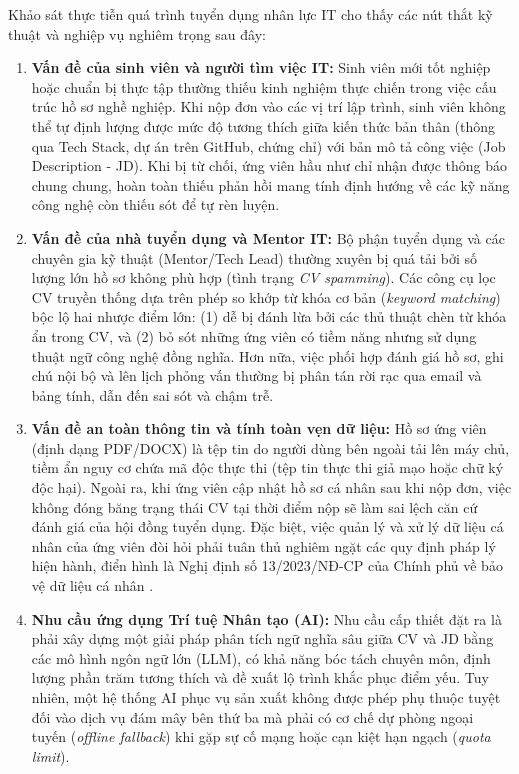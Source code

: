 Khảo sát thực tiễn quá trình tuyển dụng nhân lực IT cho thấy các nút thắt kỹ thuật và nghiệp vụ nghiêm trọng sau đây:
\begin{enumerate}
    \item \textbf{Vấn đề của sinh viên và người tìm việc IT:} Sinh viên mới tốt nghiệp hoặc chuẩn bị thực tập thường thiếu kinh nghiệm thực chiến trong việc cấu trúc hồ sơ nghề nghiệp. Khi nộp đơn vào các vị trí lập trình, sinh viên không thể tự định lượng được mức độ tương thích giữa kiến thức bản thân (thông qua Tech Stack, dự án trên GitHub, chứng chỉ) với bản mô tả công việc (Job Description - JD). Khi bị từ chối, ứng viên hầu như chỉ nhận được thông báo chung chung, hoàn toàn thiếu phản hồi mang tính định hướng về các kỹ năng công nghệ còn thiếu sót để tự rèn luyện.
    \item \textbf{Vấn đề của nhà tuyển dụng và Mentor IT:} Bộ phận tuyển dụng và các chuyên gia kỹ thuật (Mentor/Tech Lead) thường xuyên bị quá tải bởi số lượng lớn hồ sơ không phù hợp (tình trạng \textit{CV spamming}). Các công cụ lọc CV truyền thống dựa trên phép so khớp từ khóa cơ bản (\textit{keyword matching}) bộc lộ hai nhược điểm lớn: (1) dễ bị đánh lừa bởi các thủ thuật chèn từ khóa ẩn trong CV, và (2) bỏ sót những ứng viên có tiềm năng nhưng sử dụng thuật ngữ công nghệ đồng nghĩa. Hơn nữa, việc phối hợp đánh giá hồ sơ, ghi chú nội bộ và lên lịch phỏng vấn thường bị phân tán rời rạc qua email và bảng tính, dẫn đến sai sót và chậm trễ.
    \item \textbf{Vấn đề an toàn thông tin và tính toàn vẹn dữ liệu:} Hồ sơ ứng viên (định dạng PDF/DOCX) là tệp tin do người dùng bên ngoài tải lên máy chủ, tiềm ẩn nguy cơ chứa mã độc thực thi (tệp tin thực thi giả mạo hoặc chữ ký độc hại). Ngoài ra, khi ứng viên cập nhật hồ sơ cá nhân sau khi nộp đơn, việc không đóng băng trạng thái CV tại thời điểm nộp sẽ làm sai lệch căn cứ đánh giá của hội đồng tuyển dụng. Đặc biệt, việc quản lý và xử lý dữ liệu cá nhân của ứng viên đòi hỏi phải tuân thủ nghiêm ngặt các quy định pháp lý hiện hành, điển hình là Nghị định số 13/2023/NĐ-CP của Chính phủ về bảo vệ dữ liệu cá nhân \cite{decree13}.
    \item \textbf{Nhu cầu ứng dụng Trí tuệ Nhân tạo (AI):} Nhu cầu cấp thiết đặt ra là phải xây dựng một giải pháp phân tích ngữ nghĩa sâu giữa CV và JD bằng các mô hình ngôn ngữ lớn (LLM), có khả năng bóc tách chuyên môn, định lượng phần trăm tương thích và đề xuất lộ trình khắc phục điểm yếu. Tuy nhiên, một hệ thống AI phục vụ sản xuất không được phép phụ thuộc tuyệt đối vào dịch vụ đám mây bên thứ ba mà phải có cơ chế dự phòng ngoại tuyến (\textit{offline fallback}) khi gặp sự cố mạng hoặc cạn kiệt hạn ngạch (\textit{quota limit}).
\end{enumerate}

